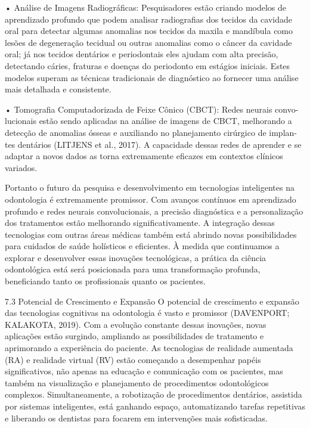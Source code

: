     • Análise de Imagens Radiográficas: Pesquisadores estão criando modelos de
      aprendizado profundo que podem analisar radiografias dos tecidos da cavidade
      oral para detectar algumas anomalias nos tecidos da maxila e mandíbula como
      lesões de degeneração tecidual ou outras anomalias como o câncer da cavidade
      oral; já nos tecidos dentários e periodontais eles ajudam com alta precisão,
      detectando cáries, fraturas e doenças do periodonto em estágios iniciais. Estes
      modelos superam as técnicas tradicionais de diagnóstico ao fornecer uma análise
      mais detalhada e consistente.

    • Tomografia Computadorizada de Feixe Cônico (CBCT): Redes neurais convo-
      lucionais estão sendo aplicadas na análise de imagens de CBCT, melhorando a
      detecção de anomalias ósseas e auxiliando no planejamento cirúrgico de implan-
      tes dentários (LITJENS et al., 2017). A capacidade dessas redes de aprender e
      se adaptar a novos dados as torna extremamente eficazes em contextos clínicos
      variados.

         Portanto o futuro da pesquisa e desenvolvimento em tecnologias inteligentes
na odontologia é extremamente promissor. Com avanços contínuos em aprendizado
profundo e redes neurais convolucionais, a precisão diagnóstica e a personalização
dos tratamentos estão melhorando significativamente. A integração dessas tecnologias
com outras áreas médicas também está abrindo novas possibilidades para cuidados de
saúde holísticos e eficientes. À medida que continuamos a explorar e desenvolver essas
inovações tecnológicas, a prática da ciência odontológica está será posicionada para
uma transformação profunda, beneficiando tanto os profissionais quanto os pacientes.


7.3     Potencial de Crescimento e Expansão
O potencial de crescimento e expansão das tecnologias cognitivas na odontologia é
vasto e promissor (DAVENPORT; KALAKOTA, 2019). Com a evolução constante dessas
inovações, novas aplicações estão surgindo, ampliando as possibilidades de tratamento
e aprimorando a experiência do paciente. As tecnologias de realidade aumentada (RA)
e realidade virtual (RV) estão começando a desempenhar papéis significativos, não
apenas na educação e comunicação com os pacientes, mas também na visualização
e planejamento de procedimentos odontológicos complexos. Simultaneamente, a
robotização de procedimentos dentários, assistida por sistemas inteligentes, está
ganhando espaço, automatizando tarefas repetitivas e liberando os dentistas para
focarem em intervenções mais sofisticadas.

